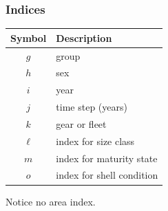 \documentclass{beamer}
\begin{document}

\begin{frame}
\frametitle{Indices}
\begin{table}
  \centering
  \begin{tabular}{cl}
  \hline
  Symbol  & Description \\
  \hline
      $g$ & group \\
      $h$ & sex \\
      $i$ & year \\
      $j$ & time step (years) \\
      $k$ & gear or fleet \\
      $\ell$ & index for size class \\
      $m$ & index for maturity state \\
      $o$ & index for shell condition \\
  \hline
  \end{tabular}
\end{table}
Notice no area index.
\end{frame}

\end{document}
